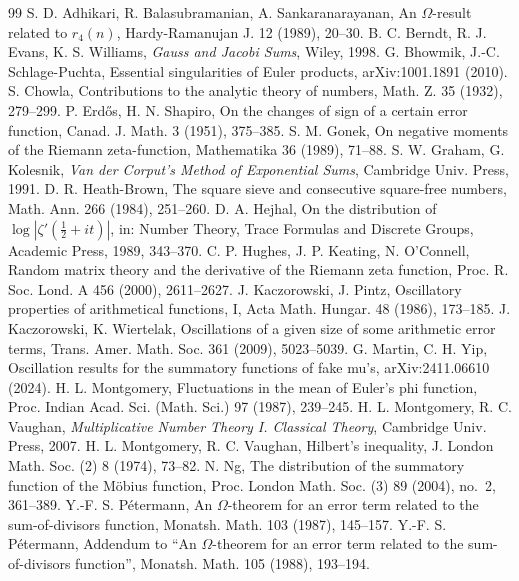 \documentclass[11pt]{amsart}
\theoremstyle{remark}
\begin{document}
\begin{thebibliography}{99}
 S. D. Adhikari, R. Balasubramanian, A. Sankaranarayanan, An $\Omega$-result related to $r_4(n)$, Hardy-Ramanujan J. 12 (1989), 20--30.
 B. C. Berndt, R. J. Evans, K. S. Williams, \emph{Gauss and Jacobi Sums}, Wiley, 1998.
 G. Bhowmik, J.-C. Schlage-Puchta, Essential singularities of Euler products, arXiv:1001.1891 (2010).
 S. Chowla, Contributions to the analytic theory of numbers, Math. Z. 35 (1932), 279--299.
 P. Erd\H{o}s, H. N. Shapiro, On the changes of sign of a certain error function, Canad. J. Math. 3 (1951), 375--385.
 S. M. Gonek, On negative moments of the Riemann zeta-function, Mathematika 36 (1989), 71--88.
 S. W. Graham, G. Kolesnik, \emph{Van der Corput's Method of Exponential Sums}, Cambridge Univ. Press, 1991.
 D. R. Heath-Brown, The square sieve and consecutive square-free numbers, Math. Ann. 266 (1984), 251--260.
 D. A. Hejhal, On the distribution of $\log|\zeta'(\frac12+it)|$, in: Number Theory, Trace Formulas and Discrete Groups, Academic Press, 1989, 343--370.
 C. P. Hughes, J. P. Keating, N. O'Connell, Random matrix theory and the derivative of the Riemann zeta function, Proc. R. Soc. Lond. A 456 (2000), 2611--2627.
 J. Kaczorowski, J. Pintz, Oscillatory properties of arithmetical functions, I, Acta Math. Hungar. 48 (1986), 173--185.
 J. Kaczorowski, K. Wiertelak, Oscillations of a given size of some arithmetic error terms, Trans. Amer. Math. Soc. 361 (2009), 5023--5039.
 G. Martin, C. H. Yip, Oscillation results for the summatory functions of fake mu's, arXiv:2411.06610 (2024).
 H. L. Montgomery, Fluctuations in the mean of Euler's phi function, Proc. Indian Acad. Sci. (Math. Sci.) 97 (1987), 239--245.
 H. L. Montgomery, R. C. Vaughan, \emph{Multiplicative Number Theory I. Classical Theory}, Cambridge Univ. Press, 2007.
 H. L. Montgomery, R. C. Vaughan, Hilbert's inequality, J. London Math. Soc. (2) 8 (1974), 73--82.
 N. Ng, The distribution of the summatory function of the M\"obius function, Proc. London Math. Soc. (3) 89 (2004), no.~2, 361--389.
 Y.-F. S. P\'etermann, An $\Omega$-theorem for an error term related to the sum-of-divisors function, Monatsh. Math. 103 (1987), 145--157.
 Y.-F. S. P\'etermann, Addendum to ``An $\Omega$-theorem for an error term related to the sum-of-divisors function'', Monatsh. Math. 105 (1988), 193--194.

\end{thebibliography}
\end{document}
